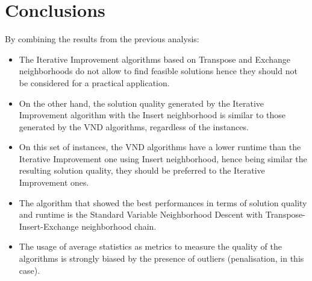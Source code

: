 \documentclass{article}
\begin{document}





\section{Conclusions}
By combining the results from the previous analysis:
\begin{itemize}
  \item The Iterative Improvement algorithms based on Transpose and Exchange neighborhoods do not allow to find feasible solutions hence they should not be considered for a practical application.
  \item On the other hand, the solution quality generated by the Iterative Improvement algorithm with the Insert neighborhood is similar to those generated by the VND algorithms, regardless of the instances.
  \item On this set of instances, the VND algorithms have a lower runtime than the Iterative Improvement one using Insert neighborhood, hence being similar the resulting solution quality, they should be preferred to the Iterative Improvement ones.
  \item The algorithm that showed the best performances in terms of solution quality and runtime is the Standard Variable Neighborhood Descent with Transpose-Insert-Exchange neighborhood chain.
  \item The usage of average statistics as metrics to measure the quality of the algorithms is strongly biased by the presence of outliers (penalisation, in this case).
\end{itemize}



%
%
\end{document}
